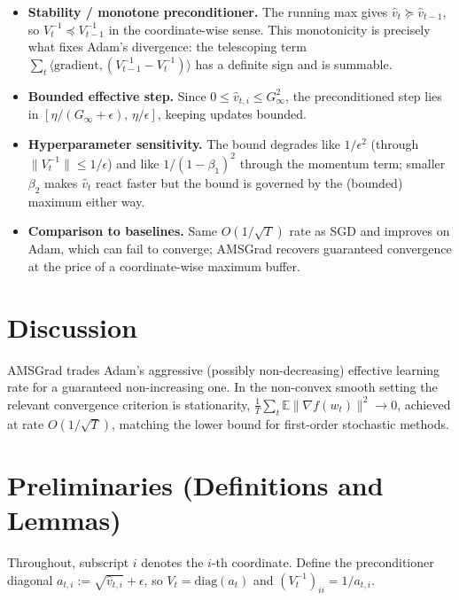 \documentclass[11pt]{article}
\begin{document}
\begin{itemize}
\item \textbf{Stability / monotone preconditioner.} The running max gives
$\hat v_t \succeq \hat v_{t-1}$, so $V_t^{-1}\preceq V_{t-1}^{-1}$ in the
coordinate-wise sense. This monotonicity is precisely what fixes Adam's
divergence: the telescoping term $\sum_t \langle \text{gradient},
(V_{t-1}^{-1}-V_t^{-1})\rangle$ has a definite sign and is summable.
\item \textbf{Bounded effective step.} Since $0\le \hat v_{t,i}\le G_\infty^2$,
the preconditioned step lies in $[\eta/(G_\infty+\epsilon),\,\eta/\epsilon]$,
keeping updates bounded.
\item \textbf{Hyperparameter sensitivity.} The bound degrades like $1/\epsilon^2$
(through $\|V_t^{-1}\|\le 1/\epsilon$) and like $1/(1-\beta_1)^2$ through the
momentum term; smaller $\beta_2$ makes $\hat v_t$ react faster but the bound is
governed by the (bounded) maximum either way.
\item \textbf{Comparison to baselines.} Same $O(1/\sqrt T)$ rate as SGD
and improves on Adam, which can fail to converge; AMSGrad recovers
guaranteed convergence at the price of a coordinate-wise maximum buffer.
\end{itemize}

\section*{Discussion}

AMSGrad trades Adam's aggressive (possibly non-decreasing) effective learning
rate for a guaranteed non-increasing one. In the non-convex smooth setting the
relevant convergence criterion is stationarity,
$\frac1T\sum_t \mathbb{E}\|\nabla f(w_t)\|^2 \to 0$, achieved at rate
$O(1/\sqrt T)$, matching the lower bound for first-order stochastic methods.

\section*{Preliminaries (Definitions and Lemmas)}

Throughout, subscript $i$ denotes the $i$-th coordinate. Define the
preconditioner diagonal $a_{t,i} := \sqrt{\hat v_{t,i}}+\epsilon$, so
$V_t = \mathrm{diag}(a_t)$ and $(V_t^{-1})_{ii} = 1/a_{t,i}$.
\end{document}
